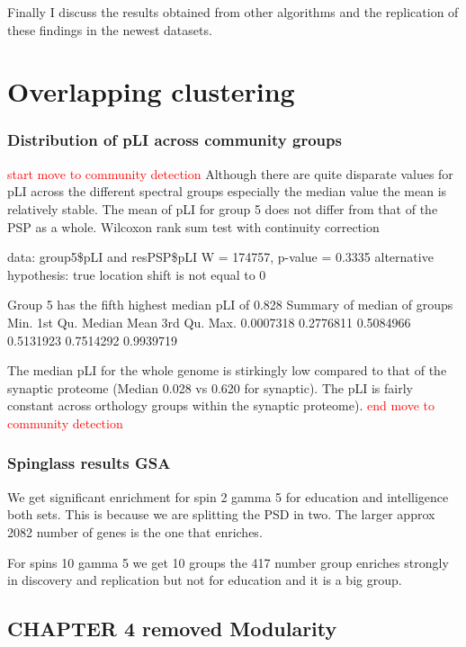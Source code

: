 Finally I discuss the results obtained from other algorithms and the replication of these findings in the newest datasets.
\section{Overlapping clustering}


\subsubsection{Distribution of pLI across community groups}
\textcolor{red}{start move to community detection}
Although there are quite disparate values for pLI across the different spectral groups especially the median value the mean is relatively stable. The mean of pLI for group 5 does not differ from that of the PSP as a whole.         Wilcoxon rank sum test with continuity correction

data:  group5\$pLI and resPSP\$pLI
W = 174757, p-value = 0.3335
alternative hypothesis: true location shift is not equal to 0

Group 5 has the fifth highest median pLI of 0.828
Summary of median of groups
    Min.   1st Qu.    Median      Mean   3rd Qu.      Max. 
0.0007318 0.2776811 0.5084966 0.5131923 0.7514292 0.9939719 

The median pLI for the whole genome is stirkingly low compared to that of the synaptic proteome (Median 0.028 vs 0.620 for synaptic). The pLI is fairly constant across orthology groups within the synaptic proteome).
\textcolor{red}{end move to community detection}


\subsubsection{Spinglass results GSA }
We get significant enrichment for spin 2 gamma 5 for education and intelligence both sets. This is because we are splitting the PSD in two. The larger approx 2082 number of genes is the one that enriches.

For spins 10 gamma 5 we get 10 groups the 417 number group enriches strongly in discovery and replication but not for education and it is a big group.
\subsection{CHAPTER 4 removed Modularity}

